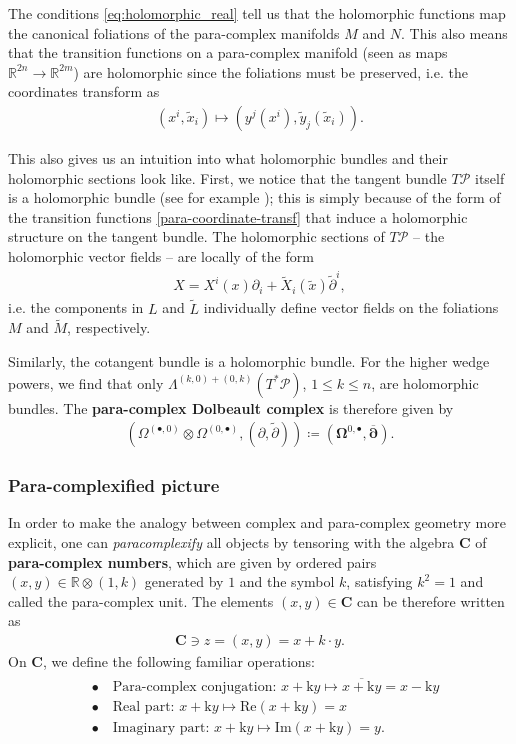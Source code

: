 \documentclass[letterpaper,12pt]{article}
\newcommand{\RR}{\mathbb{R}}
\newcommand{\PS}{\mathcal{P}}
\newcommand{\p}{\partial}
\newcommand{\pt}{\tilde{\partial}}
\newcommand{\xt}{{\tilde{x}}}
\newcommand{\Lt}{{\tl{L}}}
\newcommand{\yt}{\tl{y}}
\newcommand{\kk}{\mathrm{k}}
\newcommand{\Mt}{\tl{M}}
\newcommand{\pd}{\overline{\bm{\p}}}
\def\tl{\tilde}
\theoremstyle{definition}
\theoremstyle{remark}
\theoremstyle{examples}
\begin{document}
The conditions \eqref{eq:holomorphic_real} tell us that the holomorphic functions map the canonical foliations of the para-complex manifolds $M$ and $N$. This also means that the transition functions on a para-complex manifold (seen as maps $\RR^{2n}\rightarrow \RR^{2m}$) are holomorphic since the foliations must be preserved, i.e. the coordinates transform as
\begin{align}\label{para-coordinate-transf}
(x^i,\xt_i)\mapsto (y^j(x^i),\yt_j(\xt_i)).
\end{align}

This also gives us an intuition into what holomorphic bundles and their holomorphic sections look like. First, we notice that the tangent bundle $T\PS$ itself is a holomorphic bundle (see for example \cite{Cortes:2003zd,Hu:2019zro}); this is simply because of the form of the transition functions \eqref{para-coordinate-transf} that induce a holomorphic structure on the tangent bundle. The holomorphic sections of $T\PS$ -- the holomorphic vector fields -- are locally of the form
\begin{align}\label{para-holo-vector}
X= X^i(x)\p_i+\tl{X}_i(\xt)\pt^i,
\end{align}
i.e. the components in $L$ and $\Lt$ individually define vector fields on the foliations $M$ and $\Mt$, respectively.  

Similarly, the cotangent bundle is a holomorphic bundle. For the higher wedge powers, we find that only $\Lambda^{(k,0)+(0,k)}(T^*\PS)$, $1\leq k\leq n$, are holomorphic bundles. The {\bf para-complex Dolbeault complex} is therefore given by
\begin{align}\label{para-dolbeault}
\left(\Omega^{(\bullet,0)}\otimes\Omega^{(0,\bullet)},(\p,\pt)\right)\coloneqq \left(\mathbf{\Omega}^{0,\bullet},\pd\right).
\end{align}

\subsubsection{Para-complexified picture}
In order to make the analogy between complex and para-complex geometry more explicit, one can \textit{paracomplexify} all objects by tensoring with the algebra $\mathbf{C}$ of \textbf{para-complex numbers}, which are given by ordered pairs $(x,y)\in \mathbb{R}\otimes (1,k)$ generated by $1$ and the symbol $k$, satisfying $k^2=1$ and called the para-complex unit. The elements $(x,y)\in \mathbf{C}$ can be therefore written as
\begin{align*}
\mathbf{C} \ni z=(x,y)=x+k\cdot y.
\end{align*}
On $\mathbf{C}$, we define the following familiar operations:\begin{align}
\begin{aligned}
&\bullet\quad \text{Para-complex conjugation: }x+\kk y\mapsto \overline{x+\kk y}=x-\kk y\\
&\bullet\quad \text{Real part: } x+\kk y \mapsto \text{Re}(x+\kk y)=x\\
&\bullet\quad \text{Imaginary part: } x+\kk y \mapsto \text{Im}(x+\kk y)=y.
\end{aligned}
\end{align}
\end{document}
